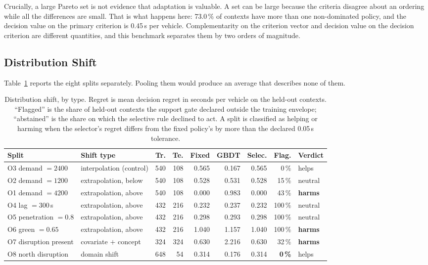 \documentclass[preprint,12pt]{elsarticle}
\begin{document}
Crucially, a large Pareto set is not evidence that adaptation is valuable. A set
can be large because the criteria disagree about an ordering while all the
differences are small. That is what happens here: 73.0\,\% of contexts have more
than one non-dominated policy, and the decision value on the primary criterion is
0.45\,s per vehicle. Complementarity on the criterion vector and decision value on
the decision criterion are different quantities, and this benchmark separates them
by two orders of magnitude.

\subsection{Distribution Shift}
\label{sec:shift}

Table~\ref{tab:shift} reports the eight splits separately. Pooling them would
produce an average that describes none of them.

\begin{table}[htbp]
\centering\scriptsize
\setlength{\tabcolsep}{3.2pt}
\caption{Distribution shift, by type. Regret is mean decision regret in seconds
per vehicle on the held-out contexts. ``Flagged'' is the share of held-out
contexts the support gate declared outside the training envelope; ``abstained''
is the share on which the selective rule declined to act. A split is classified
as helping or harming when the selector's regret differs from the fixed policy's
by more than the declared 0.05\,s tolerance.}
\label{tab:shift}
\begin{tabular}{@{}llrrrrrrl@{}}
\toprule
Split & Shift type & Tr. & Te. & Fixed & GBDT & Selec. & Flag. & Verdict\\
\midrule
O3 demand $=2400$ & interpolation (control) & 540 & 108 & 0.565 & 0.167 & 0.565 & 0\,\% & helps\\
O2 demand $=1200$ & extrapolation, below & 540 & 108 & 0.528 & 0.531 & 0.528 & 15\,\% & neutral\\
O1 demand $=4200$ & extrapolation, above & 540 & 108 & 0.000 & 0.983 & 0.000 & 43\,\% & \textbf{harms}\\
O4 lag $=300$\,s & extrapolation, above & 432 & 216 & 0.232 & 0.237 & 0.232 & 100\,\% & neutral\\
O5 penetration $=0.8$ & extrapolation, above & 432 & 216 & 0.298 & 0.293 & 0.298 & 100\,\% & neutral\\
O6 green $=0.65$ & extrapolation, above & 432 & 216 & 1.040 & 1.157 & 1.040 & 100\,\% & \textbf{harms}\\
O7 disruption present & covariate $+$ concept & 324 & 324 & 0.630 & 2.216 & 0.630 & 32\,\% & \textbf{harms}\\
O8 north disruption & domain shift & 648 & 54 & 0.314 & 0.176 & 0.314 & \textbf{0\,\%} & helps\\
\bottomrule
\end{tabular}
\end{table}
\end{document}
